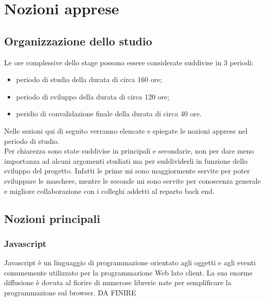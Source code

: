 
\chapter{Nozioni apprese}
\label{cap:nozioni-apprese}


\section{Organizzazione dello studio}

Le ore complessive dello stage possono essere considerate suddivise in 3 periodi:
\begin{itemize}
	\item periodo di studio della durata di circa 160 ore;
	\item periodo di sviluppo della durata di circa 120 ore;
	\item peridio di convalidazione finale della durata di circa 40 ore.
\end{itemize}
Nelle sezioni qui di seguito verranno elencate e spiegate le nozioni apprese nel periodo di studio.\\
Per chiarezza sono state suddivise in principali e secondarie, non per dare meno importanza ad alcuni argomenti studiati ma per suddividerli in funzione dello sviluppo del progetto. Infatti le prime mi sono maggiormente servite per poter sviluppare le maschere, mentre le seconde mi sono servite per conoscenza generale e migliore collaborazione con i colleghi addetti al reparto back end.

\section{Nozioni principali}

\subsection{Javascript}

Javascript è un linguaggio di programmazione orientato agli oggetti e agli eventi comunemente utilizzato per la programmazione Web lato client. La sua enorme diffusione è dovuta al fiorire di numerose librerie nate per semplificare la programmazione sul browser. DA FINIRE

